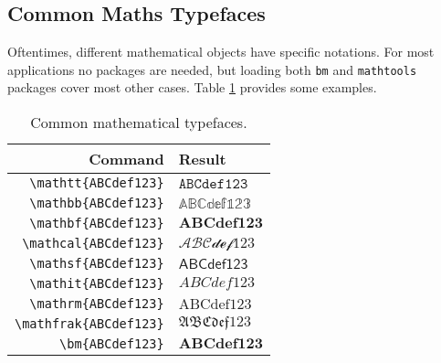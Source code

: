 \subsection{Common Maths Typefaces}
%
Oftentimes, different mathematical objects have specific notations. For most applications no packages are needed, but loading both \verb|bm| and \verb|mathtools| packages cover most other cases. Table \ref{t:mt} provides some examples.
\begin{table}[!htbp]
    \centering
    \caption{Common mathematical typefaces.}
    \label{t:mt}
    \begin{tabular}{rl}
        \toprule
        Command & Result \\
        \midrule
        \verb|\mathtt{ABCdef123}| & $\mathtt{ABCdef123}$ \\
        \verb|\mathbb{ABCdef123}| & $\mathbb{ABCdef123}$ \\
        \verb|\mathbf{ABCdef123}| & $\mathbf{ABCdef123}$ \\
        \verb|\mathcal{ABCdef123}| & $\mathcal{ABCdef123}$ \\
        \verb|\mathsf{ABCdef123}| & $\mathsf{ABCdef123}$ \\
        \verb|\mathit{ABCdef123}| & $\mathit{ABCdef123}$ \\
        \verb|\mathrm{ABCdef123}| & $\mathrm{ABCdef123}$ \\
        \verb|\mathfrak{ABCdef123}| & $\mathfrak{ABCdef123}$ \\
        \verb|\bm{ABCdef123}| & $\bm{ABCdef123}$ \\
        \bottomrule
    \end{tabular}
\end{table}
%
